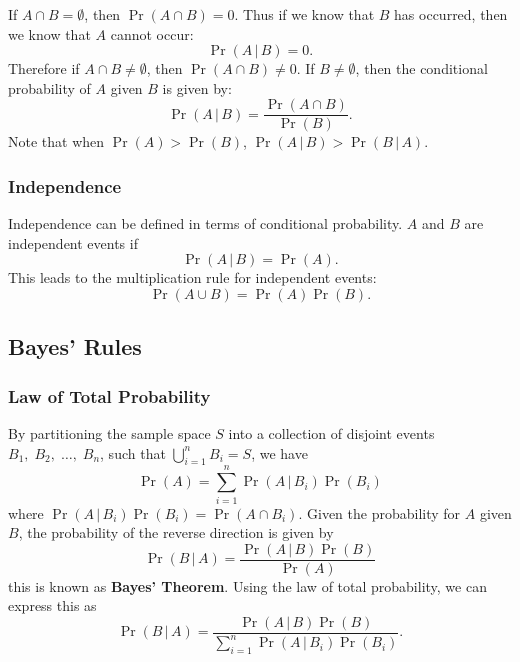 \documentclass{article}
\begin{document}
If \(A \cap B = \emptyset\), then \(\Pr{\left( A \cap B \right)} = 0\). Thus if we know that \(B\) has
occurred, then we know that \(A\) cannot occur:
\begin{equation*}
    \Pr{\left( A \,\vert\, B \right)} = 0.
\end{equation*}
Therefore if \(A \cap B \neq \emptyset\), then \(\Pr{\left( A \cap B \right)} \neq 0\).
If \(B \neq \emptyset\), then the conditional probability of \(A\) given \(B\) is given by:
\begin{equation*}
    \Pr{\left( A \,\vert\, B \right)} = \frac{\Pr{\left( A \cap B \right)}}{\Pr{\left( B \right)}}.
\end{equation*}
Note that when \(\Pr{\left( A \right)} > \Pr{\left( B \right)}\), \(\Pr{\left( A \,\vert\, B \right)} > \Pr{\left( B \,\vert\, A \right)}\).
\subsubsection{Independence}
Independence can be defined in terms of conditional probability.
\(A\) and \(B\) are independent events if
\begin{equation*}
    \Pr{\left( A \,\vert\, B \right)} = \Pr{\left( A \right)}.
\end{equation*}
This leads to the multiplication rule for independent events:
\begin{equation*}
    \Pr{\left( A \cup B \right)} = \Pr{\left( A \right)} \Pr{\left( B \right)}.
\end{equation*}
\subsection{Bayes' Rules}
\subsubsection{Law of Total Probability}
By partitioning the sample space \(S\) into a collection of disjoint events \(B_1,\; B_2,\; \dots,\; B_n\),
such that \(\bigcup_{i = 1}^n B_i = S\), we have
\begin{equation*}
    \Pr{\left( A \right)} = \sum_{i = 1}^n \Pr{\left( A \,\vert\, B_i \right)}\Pr{\left( B_i \right)}
\end{equation*}
where \(\Pr{\left( A \,\vert\, B_i \right)} \Pr{\left( B_i \right)} = \Pr{\left( A \cap B_i \right)}\).
Given the probability for \(A\) given \(B\), the probability of the reverse direction is given by
\begin{equation*}
    \Pr{\left( B \,\vert\, A \right)} = \frac{\Pr{\left( A \,\vert\, B \right)}\Pr{\left( B \right)}}{\Pr{\left( A \right)}}
\end{equation*}
this is known as \textbf{Bayes' Theorem}. Using the law of total probability, we can express this as
\begin{equation*}
    \Pr{\left( B \,\vert\, A \right)} = \frac{\Pr{\left( A \,\vert\, B \right)}\Pr{\left( B \right)}}{\sum_{i = 1}^n \Pr{\left( A \,\vert\, B_i \right)}\Pr{\left( B_i \right)}}.
\end{equation*}
\end{document}
